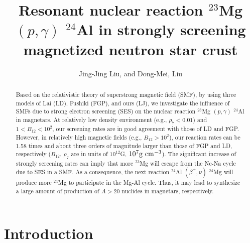 \documentclass[manuscript]{aastex}
\begin{document}
\title{Resonant nuclear reaction $^{23}$Mg $(p,\gamma)$ $^{24}$Al in strongly screening magnetized
neutron star crust}

\author{Jing-Jing Liu, and Dong-Mei, Liu}


\begin{abstract}
Based on the relativistic theory of superstrong magnetic field
(SMF), by using three models of Lai (LD), Fushiki (FGP), and ours
(LJ), we investigate the influence of SMFs due to strong electron
screening (SES) on the nuclear reaction $^{23}$Mg $(p, \gamma)$
$^{24}$Al in magnetars. At relatively low density environment (e.g.,
$\rho_7<0.01$) and $1<B_{12}<10^2$, our screening rates are in good
agreement with those of LD and FGP. However, in relatively high
magnetic fields (e.g., $B_{12}>10^2$), our reaction rates can be
1.58 times and about three orders of magnitude larger than those of
FGP and LD, respectively ($B_{12}$, $\rho_7$ are in units of
$10^{12}$G, $10^7\rm{g~cm^{-3}}$). The significant increase of
strongly screening rates can imply that more $^{23}$Mg will escape
from the Ne-Na cycle due to SES in a SMF. As a consequence, the next
reaction $^{24}$Al $(\beta^+, \nu)$ $^{24}$Mg will produce more
$^{24}$Mg to participate in the Mg-Al cycle. Thus, it may lead to
synthesize a large amount of production of $A > 20$ nuclides in
magnetars, respectively.

\end{abstract}


\section{Introduction}
\end{document}
